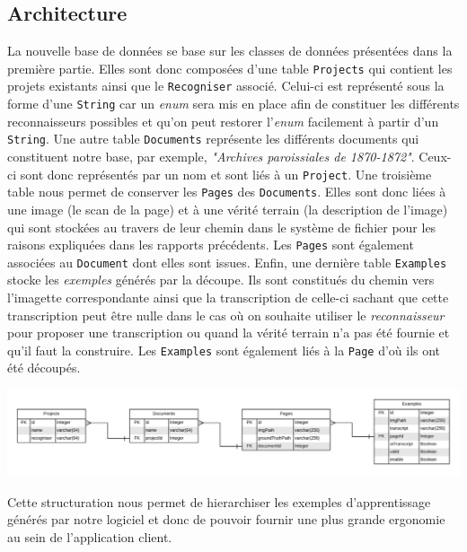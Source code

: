 \subsection{Architecture}

La nouvelle base de données se base sur les classes de données présentées dans la première partie. Elles sont donc composées d'une table \texttt{Projects} qui contient les projets existants ainsi que le \texttt{Recogniser} associé. Celui-ci est représenté sous la forme d'une \texttt{String} car un \textit{enum} sera mis en place afin de constituer les différents reconnaisseurs possibles et qu'on peut restorer l'\textit{enum} facilement à partir d'un \texttt{String}. Une autre table \texttt{Documents} représente les différents documents qui constituent notre base, par exemple, \textit{"Archives paroissiales de 1870-1872"}. Ceux-ci sont donc représentés par un nom et sont liés à un \texttt{Project}. Une troisième table nous permet de conserver les \texttt{Pages} des \texttt{Documents}. Elles sont donc liées à une image (le scan de la page) et à une vérité terrain (la description de l'image) qui sont stockées au travers de leur chemin dans le système de fichier pour les raisons expliquées dans les rapports précédents. Les \texttt{Pages} sont également associées au \texttt{Document} dont elles sont issues. Enfin, une dernière table \texttt{Examples} stocke les \textit{exemples} générés par la découpe. Ils sont constitués du chemin vers l'imagette correspondante ainsi que la transcription de celle-ci sachant que cette transcription peut être nulle dans le cas où on souhaite utiliser le \textit{reconnaisseur} pour proposer une transcription ou quand la vérité terrain n'a pas été fournie et qu'il faut la construire. Les \texttt{Examples} sont également liés à la \texttt{Page} d'où ils ont été découpés.

\begin{mdframed}[frametitle={Structure de la base de données}, innerbottommargin=10]
\begin{center}
\includegraphics[scale=0.53]{assets/DatabaseEntity.pdf}
\end{center}
\end{mdframed}

Cette structuration nous permet de hierarchiser les exemples d'apprentissage générés par notre logiciel et donc de pouvoir fournir une plus grande ergonomie au sein de l'application client. 

